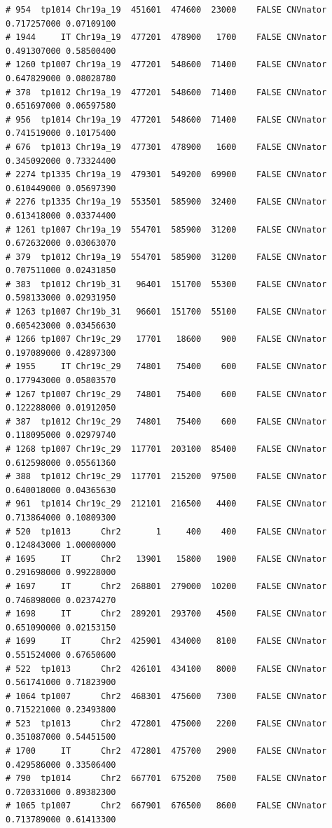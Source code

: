 \documentclass{article}\usepackage[]{graphicx}\usepackage[]{color}
\makeatletter
\newenvironment{kframe}{%
 \def\at@end@of@kframe{}%
 \ifinner\ifhmode%
  \def\at@end@of@kframe{\end{minipage}}%
  \begin{minipage}{\columnwidth}%
 \fi\fi%
 \def\FrameCommand##1{\hskip\@totalleftmargin \hskip-\fboxsep
 \colorbox{shadecolor}{##1}\hskip-\fboxsep
     \hskip-\linewidth \hskip-\@totalleftmargin \hskip\columnwidth}%
 \MakeFramed {\advance\hsize-\width
   \@totalleftmargin\z@ \linewidth\hsize
   \@setminipage}}%
 {\par\unskip\endMakeFramed%
 \at@end@of@kframe}
\newenvironment{knitrout}{}{} %
\makeatother
\begin{document}
\begin{knitrout}
\begin{kframe}
\begin{verbatim}
# 954  tp1014 Chr19a_19  451601  474600  23000    FALSE CNVnator 0.717257000 0.07109100
# 1944     IT Chr19a_19  477201  478900   1700    FALSE CNVnator 0.491307000 0.58500400
# 1260 tp1007 Chr19a_19  477201  548600  71400    FALSE CNVnator 0.647829000 0.08028780
# 378  tp1012 Chr19a_19  477201  548600  71400    FALSE CNVnator 0.651697000 0.06597580
# 956  tp1014 Chr19a_19  477201  548600  71400    FALSE CNVnator 0.741519000 0.10175400
# 676  tp1013 Chr19a_19  477301  478900   1600    FALSE CNVnator 0.345092000 0.73324400
# 2274 tp1335 Chr19a_19  479301  549200  69900    FALSE CNVnator 0.610449000 0.05697390
# 2276 tp1335 Chr19a_19  553501  585900  32400    FALSE CNVnator 0.613418000 0.03374400
# 1261 tp1007 Chr19a_19  554701  585900  31200    FALSE CNVnator 0.672632000 0.03063070
# 379  tp1012 Chr19a_19  554701  585900  31200    FALSE CNVnator 0.707511000 0.02431850
# 383  tp1012 Chr19b_31   96401  151700  55300    FALSE CNVnator 0.598133000 0.02931950
# 1263 tp1007 Chr19b_31   96601  151700  55100    FALSE CNVnator 0.605423000 0.03456630
# 1266 tp1007 Chr19c_29   17701   18600    900    FALSE CNVnator 0.197089000 0.42897300
# 1955     IT Chr19c_29   74801   75400    600    FALSE CNVnator 0.177943000 0.05803570
# 1267 tp1007 Chr19c_29   74801   75400    600    FALSE CNVnator 0.122288000 0.01912050
# 387  tp1012 Chr19c_29   74801   75400    600    FALSE CNVnator 0.118095000 0.02979740
# 1268 tp1007 Chr19c_29  117701  203100  85400    FALSE CNVnator 0.612598000 0.05561360
# 388  tp1012 Chr19c_29  117701  215200  97500    FALSE CNVnator 0.640018000 0.04365630
# 961  tp1014 Chr19c_29  212101  216500   4400    FALSE CNVnator 0.713864000 0.10809300
# 520  tp1013      Chr2       1     400    400    FALSE CNVnator 0.124843000 1.00000000
# 1695     IT      Chr2   13901   15800   1900    FALSE CNVnator 0.291698000 0.99228000
# 1697     IT      Chr2  268801  279000  10200    FALSE CNVnator 0.746898000 0.02374270
# 1698     IT      Chr2  289201  293700   4500    FALSE CNVnator 0.651090000 0.02153150
# 1699     IT      Chr2  425901  434000   8100    FALSE CNVnator 0.551524000 0.67650600
# 522  tp1013      Chr2  426101  434100   8000    FALSE CNVnator 0.561741000 0.71823900
# 1064 tp1007      Chr2  468301  475600   7300    FALSE CNVnator 0.715221000 0.23493800
# 523  tp1013      Chr2  472801  475000   2200    FALSE CNVnator 0.351087000 0.54451500
# 1700     IT      Chr2  472801  475700   2900    FALSE CNVnator 0.429586000 0.33506400
# 790  tp1014      Chr2  667701  675200   7500    FALSE CNVnator 0.720331000 0.89382300
# 1065 tp1007      Chr2  667901  676500   8600    FALSE CNVnator 0.713789000 0.61413300

\end{verbatim}
\end{kframe}
\end{knitrout}
\end{document}
